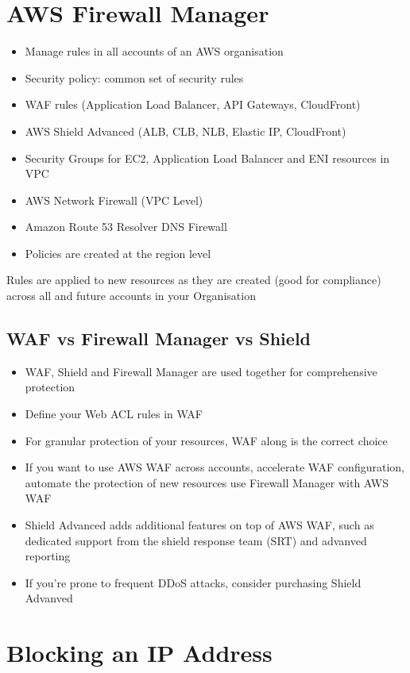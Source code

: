 \section{AWS Firewall Manager}
\begin{itemize}
    \item Manage rules in all accounts of an AWS organisation
    \item Security policy: common set of security rules
    \item WAF rules (Application Load Balancer, API Gateways, CloudFront)
    \item AWS Shield Advanced (ALB, CLB, NLB, Elastic IP, CloudFront)
    \item Security Groups for EC2, Application Load Balancer and ENI resources in VPC
    \item AWS Network Firewall (VPC Level)
    \item Amazon Route 53 Resolver DNS Firewall
    \item Policies are created at the region level
\end{itemize}

Rules are applied to new resources as they are created (good for compliance) across all and future accounts in your Organisation

\subsection{WAF vs Firewall Manager vs Shield}
\begin{itemize}
    \item WAF, Shield and Firewall Manager are used together for comprehensive protection
    \item Define your Web ACL rules in WAF
    \item For granular protection of your resources, WAF along is the correct choice
    \item If you want to use AWS WAF across accounts, accelerate WAF configuration, automate the protection of new resources use Firewall Manager with AWS WAF
    \item Shield Advanced adds additional features on top of AWS WAF, such as dedicated support from the shield response team (SRT) and advanved reporting
    \item If you're prone to frequent DDoS attacks, consider purchasing Shield Advanved
\end{itemize}


\section{Blocking an IP Address}

